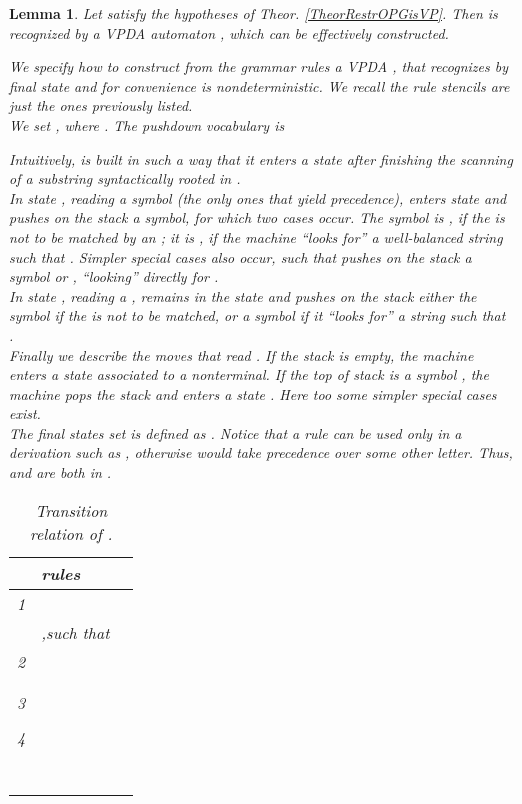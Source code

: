 \documentclass[3p,11pt]{elsarticle}
\newtheorem{lemma}[theorem]{Lemma}
\newenvironment{proof}[1][Proof]{\begin{trivlist}
\item[\hskip \labelsep {\bfseries #1}]}{\end{trivlist}}
\begin{document}
\begin{lemma}\label{LemmaRestrOPG2VPA}
Let   satisfy the hypotheses of Theor. \ref{TheorRestrOPGisVP}. Then  is recognized by a VPDA automaton , which can be effectively constructed.
 \begin{proof}
  We specify how to construct from the grammar rules a VPDA , that recognizes by final state and for convenience is nondeterministic. We recall the rule stencils are just the ones previously listed.
\\
We set , where  . The pushdown vocabulary is

Intuitively,  is built in such a way that it enters a state  after finishing the scanning of a substring syntactically rooted in .
\\
In state , reading a symbol   (the only ones that yield precedence),  enters state   and pushes  on the stack a symbol, for which two cases occur. The symbol is , if the  is not to be matched by an ; it is , if the machine ``looks for'' a well-balanced string  such that . Simpler special cases also occur, such that  pushes on the stack a symbol  or , ``looking'' directly for .
\\
In state , reading a ,   remains in the state and pushes on the stack either the symbol  if the  is not to be matched, or a symbol  if it ``looks for'' a string  such that .
\\
Finally we describe the moves that read . If the stack is empty, the machine  enters a state  associated to a nonterminal. If the top of stack is a symbol , the machine pops the stack and enters a state . Here too some simpler special cases exist.
\\
The final states set is defined as . Notice that a rule  can be used only in a derivation  such as , otherwise  would take precedence over some other letter. Thus,  and  are both in .

\begin{table}[h!]
\caption{\label{tableVPAMoves} Transition relation  of .}
\renewcommand{\arraystretch}{1.3}
\begin{center}
\begin{tabular}{|l|p{4cm}|p{5cm}|}  \hline
  & rules  &   \\
  \hline
 1& & 
 \\
  &,\quad such that   & 
  \\
  \hline
 2&  & 
 \\
 &   & 
 \\
 &  & 
  \\
  \hline
 3&  & 
  \\
 &  & 
  \\
  \hline
 4&  & 
  \\
                 && 
 \\
 &  & 
  \\
  &  & 
  \\
 &  & 
  \\
  & & 
  \\
                  && 
  \\
  & & 
  \\


\end{tabular}
\end{center}
\end{table}
\end{proof}
\end{lemma}
\end{document}
